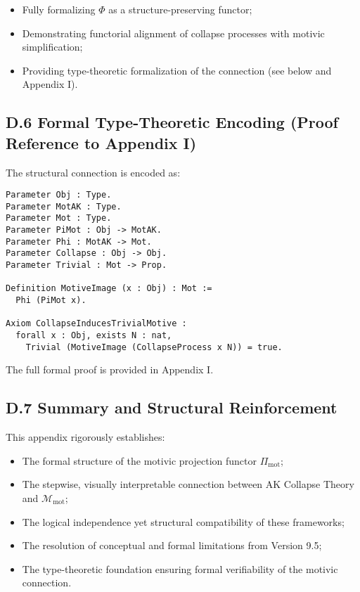 \documentclass[11pt]{article}
\begin{document}
\begin{itemize}
    \item Fully formalizing $\Phi$ as a structure-preserving functor;
    \item Demonstrating functorial alignment of collapse processes with motivic simplification;
    \item Providing type-theoretic formalization of the connection (see below and Appendix I).
\end{itemize}

\subsection*{D.6 Formal Type-Theoretic Encoding (Proof Reference to Appendix I)}

The structural connection is encoded as:

\begin{lstlisting}[language=Coq, caption=Motivic Connection Encoding]
Parameter Obj : Type.
Parameter MotAK : Type.
Parameter Mot : Type.
Parameter PiMot : Obj -> MotAK.
Parameter Phi : MotAK -> Mot.
Parameter Collapse : Obj -> Obj.
Parameter Trivial : Mot -> Prop.

Definition MotiveImage (x : Obj) : Mot :=
  Phi (PiMot x).

Axiom CollapseInducesTrivialMotive :
  forall x : Obj, exists N : nat,
    Trivial (MotiveImage (CollapseProcess x N)) = true.
\end{lstlisting}

The full formal proof is provided in Appendix I.

\subsection*{D.7 Summary and Structural Reinforcement}

This appendix rigorously establishes:

\begin{itemize}
    \item The formal structure of the motivic projection functor $\Pi_{\mathrm{mot}}$;
    \item The stepwise, visually interpretable connection between AK Collapse Theory and $\mathcal{M}_{\mathrm{mot}}$;
    \item The logical independence yet structural compatibility of these frameworks;
    \item The resolution of conceptual and formal limitations from Version 9.5;
    \item The type-theoretic foundation ensuring formal verifiability of the motivic connection.
\end{itemize}
\end{document}
